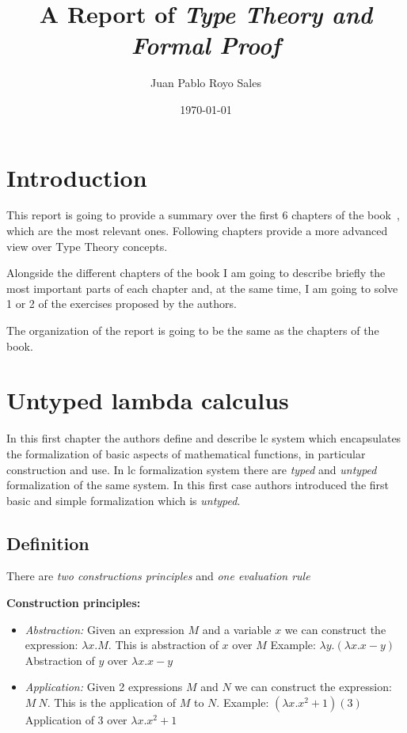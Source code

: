 \documentclass[12pt, a4paper]{article}
\title{%
      A Report of \textit{Type Theory and Formal Proof}
}
\author{Juan Pablo Royo Sales}
\affil{Universitat Politècnica de Catalunya}
\date\today
\begin{document}
\maketitle

\tableofcontents

\section{Introduction}
This report is going to provide a summary over the first 6 chapters of the book~\cite{type_theory}, which are the most relevant ones.
Following chapters provide a more advanced view over Type Theory concepts.

Alongside the different chapters of the book I am going to describe briefly the most important parts of each chapter and, at the same time,
I am going to solve 1 or 2 of the exercises proposed by the authors.

The organization of the report is going to be the same as the chapters of the book.

\section{Untyped lambda calculus}
In this first chapter the authors define and describe \acrfull{lc} system which encapsulates the formalization of basic aspects
of mathematical functions, in particular construction and use. In \acrshort{lc} formalization system there are \textit{typed} and \textit{untyped} 
formalization of the same system. In this first case authors introduced the first basic and simple formalization which is \textit{untyped}.

\subsection{Definition}
There are \textit{two constructions principles} and \textit{one evaluation rule}

\textbf{Construction principles:}

\begin{itemize}
    \item \textit{Abstraction:} Given an expression $M$ and a variable $x$ we can construct the expression: $\lambda x.M$. This is abstraction of $x$ over $M$
    Example: $\lambda y.(\lambda x. x - y)$ Abstraction of $y$ over $\lambda x. x - y$
    \item \textit{Application:} Given 2 expressions $M$ and $N$ we can construct the expression: $M\ N$. This is the application of $M$ to $N$.
    Example: $(\lambda x.x^2 + 1)(3)$ Application of $3$ over $\lambda x.x^2 + 1$
\end{itemize}
\end{document}
